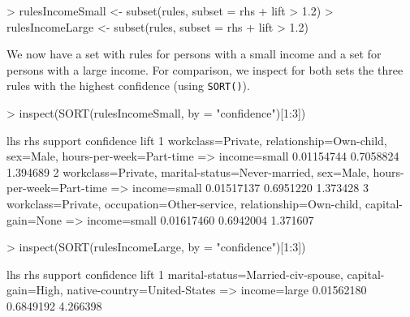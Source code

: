 \documentclass[10pt,a4paper]{article}
\newcommand{\func}[1]{\mbox{\texttt{#1()}}}
\begin{document}
\begin{Schunk}
\begin{Sinput}
> rulesIncomeSmall <- subset(rules, subset = rhs %
+     lift > 1.2)
> rulesIncomeLarge <- subset(rules, subset = rhs %
+     lift > 1.2)
\end{Sinput}
\end{Schunk}

We now have a set with rules for persons with a small income and a set
for persons with a large income.  For comparison, we inspect for both
sets the three rules with the highest confidence (using \func{SORT}).

{\samepage\small
\begin{Schunk}
\begin{Sinput}
> inspect(SORT(rulesIncomeSmall, by = "confidence")[1:3])
\end{Sinput}
\begin{Soutput}
  lhs                               rhs               support confidence     lift
1 {workclass=Private,                                                            
   relationship=Own-child,                                                       
   sex=Male,                                                                     
   hours-per-week=Part-time}     => {income=small} 0.01154744  0.7058824 1.394689
2 {workclass=Private,                                                            
   marital-status=Never-married,                                                 
   sex=Male,                                                                     
   hours-per-week=Part-time}     => {income=small} 0.01517137  0.6951220 1.373428
3 {workclass=Private,                                                            
   occupation=Other-service,                                                     
   relationship=Own-child,                                                       
   capital-gain=None}            => {income=small} 0.01617460  0.6942004 1.371607
\end{Soutput}
\begin{Sinput}
> inspect(SORT(rulesIncomeLarge, by = "confidence")[1:3])
\end{Sinput}
\begin{Soutput}
  lhs                                    rhs               support confidence     lift
1 {marital-status=Married-civ-spouse,                                                 
   capital-gain=High,                                                                 
   native-country=United-States}      => {income=large} 0.01562180  0.6849192 4.266398

\end{Soutput}
\end{Schunk}}
\end{document}
